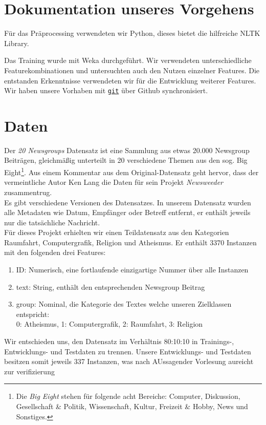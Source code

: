 \documentclass[
	11pt,
	a4paper
]{scrartcl}
\newcommand{\code}[1]{\texttt{\ul{#1}}}
\begin{document}
\section{Dokumentation unseres Vorgehens}
Für das Präprocessing verwendeten wir Python, dieses bietet die hilfreiche NLTK Library.

Das Training wurde mit Weka durchgeführt. Wir verwendeten unterschiedliche Featurekombinationen und untersuchten auch den Nutzen einzelner Features. Die entstanden Erkenntnisse
verwendeten wir für die Entwicklung weiterer Features. Wir haben unsere Vorhaben mit \code{git} über Github synchronisiert.\\

\section{Daten}
Der \emph{20 Newsgroups} Datensatz ist eine Sammlung aus etwas 20.000 Newsgroup Beiträgen, gleichmäßig unterteilt in 20
verschiedene Themen aus den sog. Big Eight\footnote{Die \emph{Big Eight} stehen für folgende acht Bereiche: Computer,
Diskussion, Gesellschaft \& Politik, Wissenschaft, Kultur, Freizeit \& Hobby, News und Sonstiges.}. Aus einem Kommentar
aus dem Original-Datensatz geht hervor, dass der vermeintliche Autor Ken Lang die Daten für sein Projekt \emph{Newsweeder}
zusammentrug.\\
Es gibt verschiedene Versionen des Datensatzes. In unserem Datensatz wurden alle Metadaten wie Datum, Empfänger oder Betreff
entfernt, er enthält jeweils nur die tatsächliche Nachricht.\\

Für dieses Projekt erhielten wir einen Teildatensatz aus den Kategorien Raumfahrt,
Computergrafik, Religion und Atheismus. Er enthält 3370 Instanzen mit den folgenden drei Features:
\begin{enumerate}[label=\roman*), itemsep=0pt,parsep=0pt, topsep=0pt]
	\item ID: Numerisch, eine fortlaufende einzigartige Nummer über alle Instanzen
	\item text: String, enthält den entsprechenden Newsgroup Beitrag
	\item group: Nominal, die Kategorie des Textes welche unseren Zielklassen entspricht:\\
		0: Atheismus, 1: Computergrafik, 2: Raumfahrt, 3: Religion
\end{enumerate}

Wir entschieden uns, den Datensatz im Verhältnis 80:10:10 in Trainings-, Entwicklungs- und Testdaten zu trennen. Unsere Entwicklungs- und Testdaten besitzen somit jeweils 337 Instanzen, was nach AUssagender Vorlesung aureicht zur verifizierung
\end{document}
